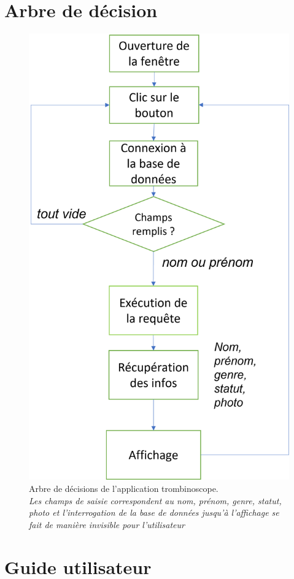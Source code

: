 \documentclass[french]{article}
\begin{document}
\newpage

\tableofcontents

\newpage

\section{Arbre de décision}

\begin{figure}[!htbp]
    \centering
    \includegraphics[width=.7\textwidth]{Image/arbre_decision.png}
    \caption{Arbre de décisions de l'application trombinoscope. \\ \textit{Les champs de saisie correspondent au nom, prénom, genre, statut, photo et l'interrogation de la base de données jusqu'à l'affichage se fait de manière invisible pour l'utilisateur}}
    \label{fig:arbre}
\end{figure}

\newpage

\section{Guide utilisateur}
\end{document}
